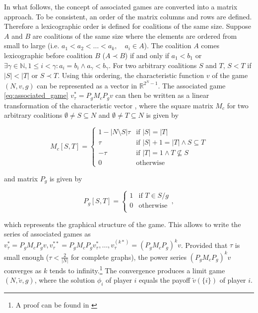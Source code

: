 In what follows, the concept of associated games are converted into a matrix approach.
To be consistent, an order of the matrix columns and rows are defined. Therefore a lexicographic order is defined
for coalitions of the same size. Suppose $A$ and $B$ are coalitions of the same size where the elements are ordered
from small to large (i.e. $a_1 < a_2 < \dots < a_k, \quad a_i \in A$). The coalition $A$ comes lexicographic
before coalition $B$ ($A \prec B$) if and only if $a_1 < b_1$ or $\exists \gamma \in \mathbb{N}, 1 \le i < \gamma: a_i = b_i \land a_\gamma < b_\gamma$.
For two arbitrary coalitions $S$ and $T$, $S < T$ if $|S| < |T|$ or $S \prec T$. Using this ordering, the characteristic
function $v$ of the game $(N, v, g)$ can be represented as a vector in $\mathbb{R}^{2^N - 1}$. The associated game
\cref{eq:associated_game} $v^*_\tau = P_g M_c P_g v$ can then be written as a linear transformation of the characteristic vector
, where the square matrix $M_c$ for two arbitrary coalitions $\emptyset \ne S \subseteq N$
and $\emptyset \ne T \subseteq N$ is given by\cite{hamiache_associated_2020,hamiache2010matrix}


\begin{equation}
	M_c[S, T] =
	\begin{cases}
		1 - |N \setminus S| \tau & \text{if } |S| = |T|                         \\
		\tau                     & \text{if } |S| + 1 = |T| \land S \subseteq T \\
		-\tau                    & \text{if } |T| = 1  \land T \not \subseteq S \\
		0                        & \text{otherwise}
	\end{cases}
\end{equation}


and matrix $P_g$ is given by

\begin{equation}
	P_g[S, T] =
	\begin{cases}
		1 & \text{if } T \in S/g \\
		0 & \text{otherwise}     \\
	\end{cases}
	,
\end{equation}


which represents the graphical structure of the game. This allows to write the series of associated
games as $v^*_\tau = P_g M_c P_g v, v^{**}_\tau = P_g M_c P_g v^*_\tau, \dots, v^{(k*)}_\tau = \left(P_g M_c P_g\right)^k v$.
Provided that $\tau$ is small enough ($\tau < \frac{2}{|N|}$ for complete graphs\cite{hamiache2001associated}),
the power series $\left(P_g M_c P_g\right)^k v$ converges as $k$ tends to infinity.\footnote{A proof can be found in \cite{hamiache_associated_2020}}
The convergence produces a limit game $(N, \tilde{v}, g)$, where the solution $\phi_i$ of player $i$ equals the
payoff $\tilde{v}(\{i\})$ of player $i$.\cite{zhang2022gstarx, hamiache_associated_2020}



